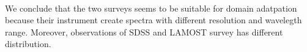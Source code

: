 \begin{figure}
\begin{center}
\\
\end{center}
\caption[QSOs coverage of SDSS and LAMOST]{}
\label{qso_coverage}
\end{figure}

We conclude that the two surveys seems to be suitable for domain adatpation
because their instrument create spectra with different resolution
and wavelegth range.
Moreover, observations of SDSS and LAMOST survey has different distribution.
